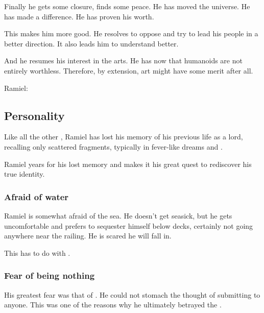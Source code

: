 Finally he gets some closure, finds some peace. 
He has moved the universe. 
He has made a difference. 
He has proven his worth. 

This makes him more good. 
He resolves to oppose \Azraid{} and try to lead his people in a better direction. 
It also leads him to understand \Ishnaruchaefir{} better. 

And he resumes his interest in the arts. 
He has now  that humanoids are not entirely worthless. 
Therefore, by extension, art might have some merit after all. 

Ramiel: 










\subsection{Personality}
Like all the other \Malachim, Ramiel has lost his memory of his previous life as a \resphan{} lord, recalling only scattered fragments, typically in fever-like dreams and \deajvus. 

Ramiel years for his lost memory and makes it his great quest to rediscover his true identity.





\subsubsection{Afraid of water}
Ramiel is somewhat afraid of the sea. 
He doesn't get seasick, but he gets uncomfortable and prefers to sequester himself below decks, certainly not going anywhere near the railing. 
He is scared he will fall in. 

This has to do with . 





\subsubsection{Fear of being nothing}
His greatest fear was that of . 
He could not stomach the thought of submitting to anyone. 
This was one of the reasons why he ultimately betrayed the \banelords. 

